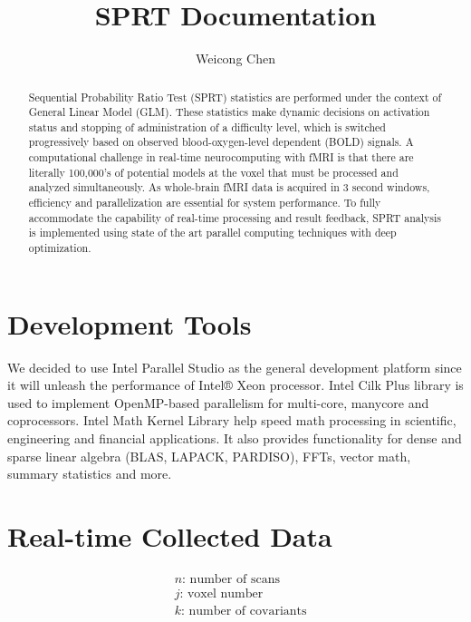 \documentclass{article}
\begin{document}
\title{SPRT Documentation}
\author{Weicong Chen}

\maketitle

\begin{abstract}
Sequential Probability Ratio Test (SPRT) statistics are performed under the context of General Linear Model (GLM). These statistics make dynamic decisions on activation status and stopping of administration of a difficulty level, which is switched progressively based on observed blood-oxygen-level dependent (BOLD) signals. A computational challenge in real-time neurocomputing with fMRI is that there are literally 100,000’s of potential models at the voxel that must be processed and analyzed simultaneously. As whole-brain fMRI data is acquired in 3 second windows, efficiency and parallelization are essential for system performance. To fully accommodate the capability of real-time processing and result feedback, SPRT analysis is implemented using state of the art parallel computing techniques with deep optimization.
\end{abstract}

\section{Development Tools}
We decided to use Intel Parallel Studio as the general development platform since it will unleash the performance of Intel® Xeon processor. Intel Cilk Plus library is used to implement OpenMP-based parallelism for multi-core, manycore and coprocessors. Intel Math Kernel Library help speed math processing in scientific, engineering and financial applications. It also provides functionality for dense and sparse linear algebra (BLAS, LAPACK, PARDISO), FFTs, vector math, summary statistics and more.\\

\section {Real-time Collected Data}
\begin{equation*}
    \label{variables}
    \begin{aligned}
    &n\text{: number of scans}\\
    &j\text{: voxel number}\\
    &k\text{: number of covariants}
    \end{aligned}
\end{equation*}\\
\end{document}
